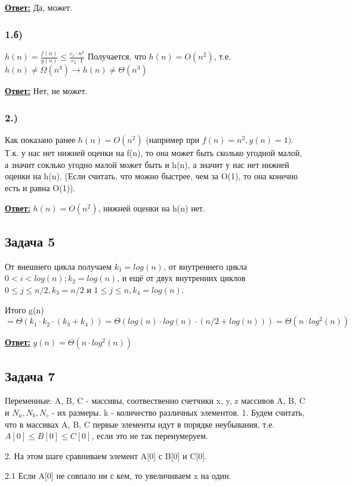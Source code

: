 \documentclass[a4paper,14pt]{article} %
\begin{document}
\underline{\textbf{Ответ:}} Да, может.

\subsubsection*{1.б)} $h(n) = \frac{f(n)}{g(n)} \leq \frac{c_1 \cdot n^2}{c_2 \cdot 1}$
Получается, что $h(n) = O(n^2)$, т.е. $h(n) \not= \Omega(n^3) \rightarrow h(n) \not= \Theta(n^3)$

\underline{\textbf{Ответ:}} Нет, не может.

\subsubsection*{2.)} Как показано ранее $h(n) = O(n^2)$ (например при $f(n) = n^2, g(n) = 1)$.
Т.к. у нас нет нижней оценки на f(n), то она может быть сколько угодной малой, а значит соклько угодно малой может быть и h(n), а значит у нас нет нижней оценки на h(n).
(Если считать, что можно быстрее, чем за O(1), то она конечно есть и равна O(1)).

\underline{\textbf{Ответ:}} $h(n) = O(n^2)$, нижней оценки на h(n) нет.


\subsection{Задача 5}
От внешнего цикла получаем $k_1 = log(n)$, от внутреннего цикла $0 < i < log(n); k_2 = log(n)$, и ещё от двух внутренних циклов $0 \leq j \leq n/2, k_3 = n / 2$ и $1 \leq j \leq n, k_4 = log(n)$.

Итого g(n) $= \Theta(k_1 \cdot k_2 \cdot (k_3 + k_4)) = \Theta(log(n) \cdot log(n) \cdot (n/2 + log(n))) = \Theta(n \cdot log^2(n))$

\underline{\textbf{Ответ:}} $g(n) = \Theta(n \cdot log^2(n))$

\subsection{Задача 7}
Переменные: A, B, C - массивы, соотвественно счетчики x, y, z массивов A, B, C и $N_a, N_b, N_c$ - их размеры. k - количество различных элементов. 
1. Будем считать, что в массивах A, B, C первые элементы идут в порядке неубывания, т.е. $A[0] \leq B[0] \leq C[0]$, если это не так перенумеруем.

2. На этом шаге сравниваем элемент A[0] с B[0] и C[0].

2.1 Если A[0] не совпало ни с кем, то увеличиваем x на один.
\end{document}
